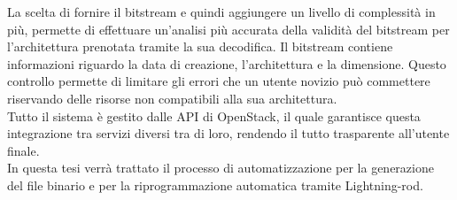 La scelta di fornire il bitstream e quindi aggiungere un livello di complessità in più,  permette di effettuare un'analisi più accurata della validità del bitstream per l'architettura prenotata tramite la sua decodifica. Il bitstream contiene informazioni riguardo la data di creazione, l'architettura e la dimensione. Questo controllo permette di limitare gli errori che un utente novizio può commettere riservando delle risorse non compatibili alla sua architettura.\\
Tutto il sistema è gestito dalle API di OpenStack, il quale garantisce questa integrazione tra servizi diversi tra di loro, rendendo il tutto trasparente all'utente finale.\\
In questa tesi verrà trattato il processo di automatizzazione per la generazione del file binario e per la riprogrammazione automatica tramite Lightning-rod.
 


